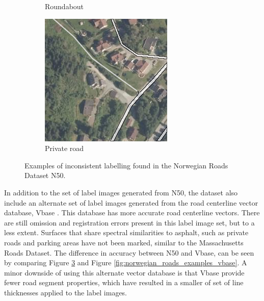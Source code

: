 \begin{figure}[h]
\begin{subfigure}{0.31\textwidth}
\caption{Roundabout} \label{fig:norwegian_roads_roundabout_n50}
\end{subfigure}
\hspace*{\fill} %
\begin{subfigure}{0.31\textwidth}
\includegraphics[width=\linewidth]{figs/datasets/nor_examples/1157_missing_n50.png}
\caption{Private road} \label{fig:norwegian_roads_missing_n50}
\end{subfigure}
\hspace*{\fill} %
\caption[Inconsistent labelling in Norwegian Roads Dataset N50]{Examples of inconsistent labelling found in the Norwegian Roads Dataset N50.} \label{fig:norwegian_roads_examples_n50}
\end{figure}

In addition to the set of label images generated from N50, the dataset also include an alternate set of label images generated from the road centerline vector database, Vbase \citep{Kartverket_vbase}. This database has more accurate road centerline vectors. There are still omission and registration errors present in this label image set, but to a less extent. Surfaces that share spectral similarities to asphalt, such as private roads and parking areas have not been marked, similar to the Massachusetts Roads Dataset. The difference in accuracy between N50 and Vbase, can be seen by comparing Figure \ref{fig:norwegian_roads_examples_n50} and Figure \ref{fig:norwegian_roads_examples_vbase}. A minor downside of using this alternate vector database is that Vbase provide fewer road segment properties, which have resulted in a smaller of set of line thicknesses applied to the label images.\\

